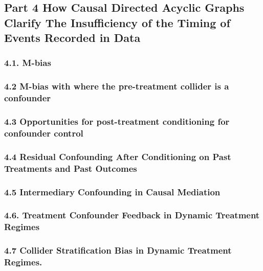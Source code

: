 \documentclass[
  single column]{article}
\begin{document}
\subsection{Part 4 How Causal Directed Acyclic Graphs Clarify The
Insufficiency of the Timing of Events Recorded in
Data}\label{part-4-how-causal-directed-acyclic-graphs-clarify-the-insufficiency-of-the-timing-of-events-recorded-in-data}

\subsubsection{4.1. M-bias}\label{m-bias}

\subsubsection{4.2 M-bias with where the pre-treatment collider is a
confounder}\label{m-bias-with-where-the-pre-treatment-collider-is-a-confounder}

\subsubsection{4.3 Opportunities for post-treatment conditioning for
confounder
control}\label{opportunities-for-post-treatment-conditioning-for-confounder-control}

\subsubsection{4.4 Residual Confounding After Conditioning on Past
Treatments and Past
Outcomes}\label{residual-confounding-after-conditioning-on-past-treatments-and-past-outcomes}

\subsubsection{4.5 Intermediary Confounding in Causal
Mediation}\label{intermediary-confounding-in-causal-mediation}

\subsubsection{4.6. Treatment Confounder Feedback in Dynamic Treatment
Regimes}\label{treatment-confounder-feedback-in-dynamic-treatment-regimes}

\subsubsection{4.7 Collider Stratification Bias in Dynamic Treatment
Regimes.}\label{collider-stratification-bias-in-dynamic-treatment-regimes.}
\end{document}
